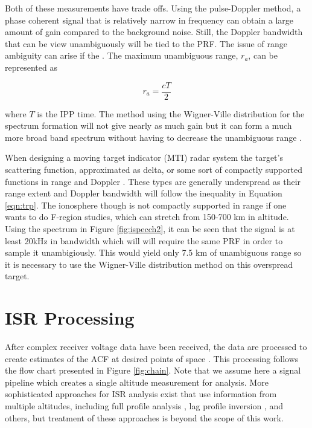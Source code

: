 Both of these measurements have trade offs. Using the pulse-Doppler method, a phase coherent signal that is relatively narrow in frequency can obtain a large amount of gain compared to the background noise. Still, the Doppler bandwidth that can be view unambiguously will be tied to the PRF. The issue of range ambiguity can arise if the . The maximum unambiguous range, $r_a$, can be represented as 

\begin{equation}
\label{eqn:maxuar}
r_a =  \frac{cT}{2}
\end{equation}

\noindent where $T$ is the IPP time. The method using the Wigner-Ville distribution for the spectrum formation will not give nearly as much gain but it can form a much more broad band spectrum without having to decrease the unambiguous range \cite{richards2014fundamentals}.

When designing a moving target indicator (MTI) radar system the target's scattering function, approximated as delta, or some sort of compactly supported functions in range and Doppler \cite{richards2014fundamentals}. These types are generally underspread as their range extent and Doppler bandwidth will follow the inequality in Equation \ref{eqn:trp}. The ionosphere though is not compactly supported in range if one wants to do F-region studies, which can stretch from 150-700 km in altitude. Using the spectrum in Figure \ref{fig:ispecch2}, it can be seen that the signal is at least 20kHz in bandwidth which will will require the same PRF in order to sample it unambigiously. This would yield only 7.5 km of unambiguous range so it is necessary to use the Wigner-Ville distribution method on this overspread target. 





\section{ISR Processing}
\label{section:isrproc}
After complex receiver voltage data have been received, the data are processed to create estimates of the ACF at desired points of space \cite{farley1969,nygren1996}. This processing follows the flow chart presented in Figure \ref{fig:chain}.  Note that we assume here a signal pipeline which creates a single altitude measurement for analysis.  More sophisticated approaches for ISR analysis exist that use information from multiple altitudes, including full profile analysis \cite{RDS:RDS3308}, lag profile inversion \cite{Virtanen:20082vx}, and others, but treatment of these approaches is beyond the scope of this work.

